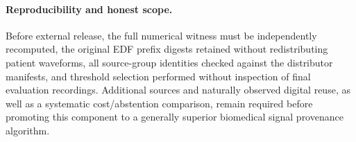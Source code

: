 \paragraph{Reproducibility and honest scope.}
Before external release, the full numerical witness must be
independently recomputed, the original EDF prefix digests retained
without redistributing patient waveforms, all source-group
identities checked against the distributor manifests, and
threshold selection performed without inspection of final
evaluation recordings. Additional sources and naturally observed
digital reuse, as well as a systematic cost/abstention comparison,
remain required before promoting this component to a generally
superior biomedical signal provenance algorithm.
